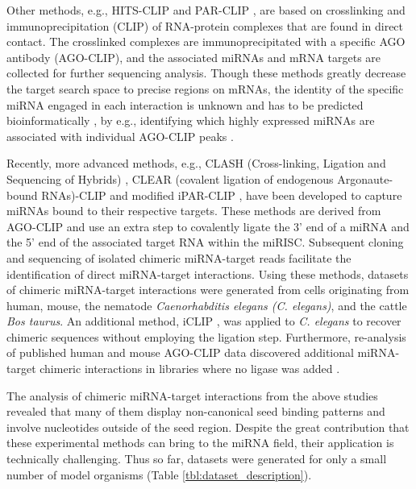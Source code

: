 Other methods, e.g., HITS-CLIP \cite{chi2009argonaute, zisoulis2010comprehensive} and PAR-CLIP \cite{hafner2010transcriptome}, are based on crosslinking and immunoprecipitation (CLIP) of RNA-protein complexes that are found in direct contact. The crosslinked complexes are immunoprecipitated with a specific AGO antibody (AGO-CLIP), and the associated miRNAs and mRNA targets are collected for further sequencing analysis. Though these methods greatly decrease the target search space to precise regions on mRNAs, the identity of the specific miRNA engaged in each interaction is unknown and has to be predicted bioinformatically \cite{wang2015design, uhl2017computational}, by e.g., identifying which highly expressed miRNAs are associated with individual AGO-CLIP peaks \cite{majoros2013microrna, reczko2012functional, liu2013clip, khorshid2013biophysical}.


Recently, more advanced methods, e.g., CLASH (Cross-linking, Ligation and Sequencing of Hybrids) \cite{helwak2013mapping}, CLEAR (covalent ligation of endogenous Argonaute-bound RNAs)-CLIP \cite{darnell_moore2015mirna, scheel2017global} and modified iPAR-CLIP \cite{grosswendt2014unambiguous}, have been developed to capture miRNAs bound to their respective targets. These methods are derived from AGO-CLIP and use an extra step to covalently ligate the 3' end of a miRNA and the 5' end of the associated target RNA within the miRISC. Subsequent cloning and sequencing of isolated chimeric miRNA-target reads facilitate the identification of direct miRNA-target interactions. Using these methods, datasets of chimeric miRNA-target interactions were generated from cells originating from human, mouse, the nematode \textit{Caenorhabditis elegans (C. elegans)}, and the cattle \textit{Bos taurus}.
An additional method, iCLIP \cite{broughton2016pairing}, was applied to \textit{C. elegans} to recover chimeric sequences without employing the ligation step. Furthermore, re-analysis of published human and mouse AGO-CLIP data discovered additional miRNA-target chimeric interactions in libraries where no ligase was added \cite{grosswendt2014unambiguous}. 

The analysis of chimeric miRNA-target interactions from the above studies revealed that many of them display non-canonical seed binding patterns and involve nucleotides outside of the seed region. Despite the great contribution that these experimental methods can bring to the miRNA field, their application is technically challenging. Thus so far, datasets were generated for only a small number of model organisms (Table \ref{tbl:dataset_description}).


